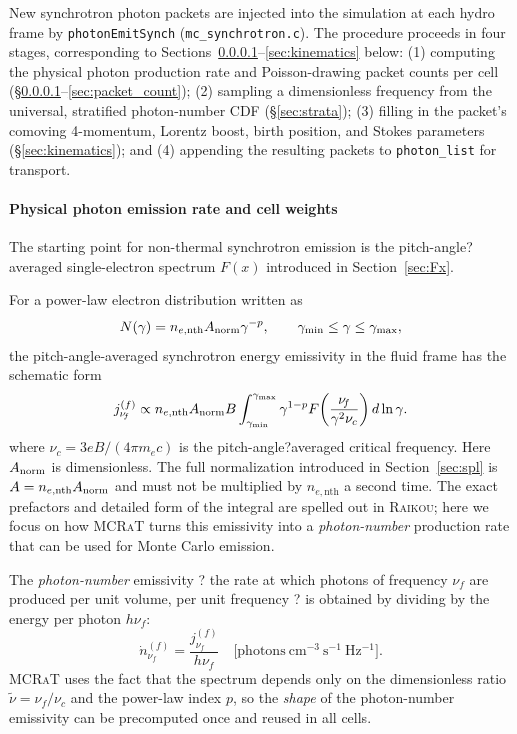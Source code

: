 \documentclass[12pt,a4paper]{article}
\newcommand{\nuth}{\tilde{\nu}}
\newcommand{\nuf}{\nu_{\!f}}
\newcommand{\nuc}{\nu_c}
\newcommand{\gmin}{\gamma_{\min}}
\newcommand{\gmax}{\gamma_{\max}}
\newcommand{\nenth}{n_{e,\mathrm{nth}}}
\newcommand{\code}[1]{\texttt{#1}}
\newcommand{\raikou}{\textsc{Raikou}}
\newcommand{\mcrat}{\textsc{MCRaT}}
\begin{document}
New synchrotron photon packets are injected into the simulation at each hydro
frame by \code{photonEmitSynch} (\code{mc\_synchrotron.c}).  The procedure
proceeds in four stages, corresponding to
Sections~\ref{sec:emissivity}--\ref{sec:kinematics} below: (1) computing the
physical photon production rate and Poisson-drawing packet counts per cell
(\S\ref{sec:emissivity}--\ref{sec:packet_count}); (2) sampling a
dimensionless frequency from the universal, stratified photon-number CDF
(\S\ref{sec:strata}); (3) filling in the packet's comoving 4-momentum,
Lorentz boost, birth position, and Stokes parameters
(\S\ref{sec:kinematics}); and (4) appending the resulting packets to
\code{photon\_list} for transport.

\paragraph{Physical photon emission rate and cell weights}
\label{sec:emissivity}

The starting point for non-thermal synchrotron emission is the
pitch-angle?averaged single-electron spectrum \(F(x)\) introduced in
Section~\ref{sec:Fx}. 

For a power-law electron distribution written as
\begin{equation}
	N(\gamma)
	=
	\nenth A_{\rm norm}\gamma^{-p},
	\qquad
	\gmin\le\gamma\le\gmax,
\end{equation}
the pitch-angle-averaged synchrotron energy emissivity in the fluid
frame has the schematic form
\begin{equation}
	j_{\nuf}^{(f)}
	\propto
	\nenth A_{\rm norm}B
	\int_{\gmin}^{\gmax}
	\gamma^{1-p}
	F\!\left(\frac{\nuf}{\gamma^2\nuc}\right)
	d\ln\gamma .
	\label{eq:jnu_schematic}
\end{equation}
where \(\nuc = 3 e B/(4\pi m_e c)\) is the pitch-angle?averaged critical
frequency. Here $A_{\rm norm}$ is dimensionless. The full normalization introduced
in Section~\ref{sec:spl} is
$A=\nenth A_{\rm norm}$ and must not be multiplied by $\nenth$ a
second time. The exact prefactors and detailed form of the integral are
spelled out in \raikou{}; here we focus on how \mcrat{} turns this
emissivity into a \emph{photon-number} production rate that can be used
for Monte Carlo emission.

The \emph{photon-number} emissivity ? the rate at which photons of
frequency \(\nuf\) are produced per unit volume, per unit frequency ? is
obtained by dividing by the energy per photon \(h\nuf\):
\begin{equation}
	\dot{n}_{\nuf}^{(f)}
	= \frac{j_{\nuf}^{(f)}}{h\nuf}
	\quad
	\bigl[\mathrm{photons\ cm^{-3}\ s^{-1}\ Hz^{-1}}\bigr].
	\label{eq:ndot_nu}
\end{equation}
\mcrat{} uses the fact that the spectrum depends only on the
dimensionless ratio \(\nuth = \nuf/\nuc\) and the power-law index \(p\),
so the \emph{shape} of the photon-number emissivity can be precomputed
once and reused in all cells.
\end{document}
